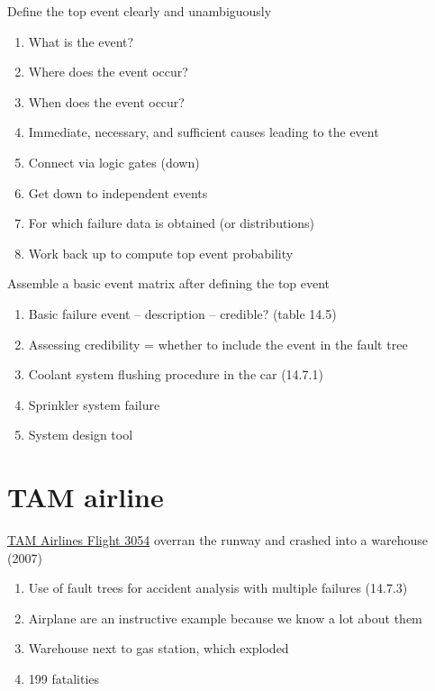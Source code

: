 \documentclass[aspectratio=1610,pdftex,dvipsnames,compress,xcolor={dvipsnames}]{beamer}
\begin{document}
\begin{frame}{Define the top event clearly and unambiguously}
    \begin{enumerate}[series=outerlist,topsep=0pt,itemsep=7pt,leftmargin=*,label=(\arabic*)]
        \item[]What is the event?  
        \item[]Where does the event occur?  
        \item[]When does the event occur?
        \item[]Immediate, necessary, and sufficient causes leading to the event
        \item[]Connect via logic gates (down)
        \item[]Get down to independent events  
        \item[]For which failure data is obtained (or distributions)  
        \item[]Work back up to compute top event probability
    \end{enumerate}
\end{frame}


\begin{frame}{Assemble a basic event matrix after defining the top event}
    \begin{enumerate}[series=outerlist,topsep=0pt,itemsep=21pt,leftmargin=*,label=(\arabic*)]
        \item[]Basic failure event -- description -- credible? (table 14.5)
        \item[]Assessing credibility = whether to include the event in the fault tree
        \item[]Coolant system flushing procedure in the car (14.7.1)
        \item[]Sprinkler system failure
        \item[]System design tool
    \end{enumerate}
\end{frame}


\section{TAM airline}


\addtocounter{framenumber}{-1}
\begin{frame}{\href{https://maps.app.goo.gl/nUTrfB5vhgz1zwSUA}{TAM Airlines Flight 3054} overran the runway and crashed into a warehouse (2007)}
    \begin{enumerate}[series=outerlist,topsep=0pt,itemsep=21pt,leftmargin=*,label=(\arabic*)]
        \item[]Use of fault trees for accident analysis with multiple failures (14.7.3)
        \item[]Airplane are an instructive example because we know a lot about them
        \item[]Warehouse next to gas station, which exploded
        \item[]199 fatalities
    \end{enumerate}
\end{frame}
\end{document}
